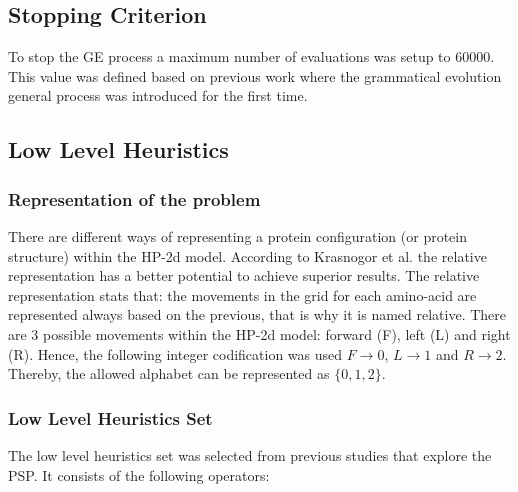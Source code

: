 \documentclass[conference]{IEEEtran}
\begin{document}
\subsection{Stopping Criterion}
\label{sub:criterioParada}

To stop the GE process a maximum number of evaluations was setup to 60000. This value was defined based on previous work \cite{ryan1998grammatical} where the grammatical evolution general process was introduced for the first time. 

  \subsection{Low Level Heuristics} 
  
  \subsubsection{Representation of the problem} 
  There are different ways of representing a protein configuration (or protein structure) within the HP-2d model. According to Krasnogor et al. \cite{krasnogor1999protein}  the relative representation has a better potential to achieve superior results. The relative representation stats that: the movements in the grid for each amino-acid are represented always based on the previous, that is why it is named relative. There are 3 possible movements within the HP-2d model: forward (F), left (L) and right (R). Hence, the following integer codification was used $F\rightarrow0$, $L\rightarrow1$ and $R\rightarrow2$. Thereby, the allowed alphabet can be represented as $\{0,1,2\}$.  

  \subsubsection{Low Level Heuristics Set}
 The low level heuristics set was selected from previous studies \cite{benitez2015algoritmo,custodio2014multiple, custodio2004investigation, garza2012multiobjectivizing} that explore the PSP. It consists of the following operators:
 
\end{document}
